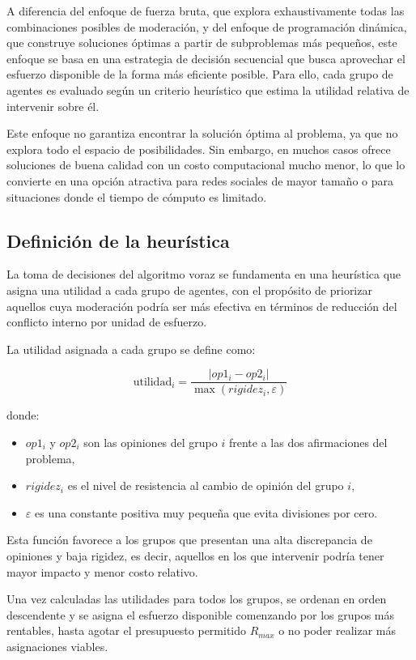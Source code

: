 \documentclass[11pt,letter]{article}
\begin{document}
    A diferencia del enfoque de fuerza bruta, que explora exhaustivamente todas las combinaciones posibles de moderación, y del enfoque de programación dinámica, que construye soluciones óptimas a partir de subproblemas más pequeños, este enfoque se basa en una estrategia de decisión secuencial que busca aprovechar el esfuerzo disponible de la forma más eficiente posible. Para ello, cada grupo de agentes es evaluado según un criterio heurístico que estima la utilidad relativa de intervenir sobre él.

    Este enfoque no garantiza encontrar la solución óptima al problema, ya que no explora todo el espacio de posibilidades. Sin embargo, en muchos casos ofrece soluciones de buena calidad con un costo computacional mucho menor, lo que lo convierte en una opción atractiva para redes sociales de mayor tamaño o para situaciones donde el tiempo de cómputo es limitado.

    \subsection{Definición de la heurística}

    La toma de decisiones del algoritmo voraz se fundamenta en una heurística que asigna una utilidad a cada grupo de agentes, con el propósito de priorizar aquellos cuya moderación podría ser más efectiva en términos de reducción del conflicto interno por unidad de esfuerzo.

    La utilidad asignada a cada grupo se define como:

    \[
        \text{utilidad}_i = \frac{|op1_i - op2_i|}{\max(rigidez_i, \varepsilon)}
    \]

    donde:
    \begin{itemize}
        \item $op1_i$ y $op2_i$ son las opiniones del grupo $i$ frente a las dos afirmaciones del problema,
        \item $rigidez_i$ es el nivel de resistencia al cambio de opinión del grupo $i$,
        \item $\varepsilon$ es una constante positiva muy pequeña que evita divisiones por cero.
    \end{itemize}

    Esta función favorece a los grupos que presentan una alta discrepancia de opiniones y baja rigidez, es decir, aquellos en los que intervenir podría tener mayor impacto y menor costo relativo.

    Una vez calculadas las utilidades para todos los grupos, se ordenan en orden descendente y se asigna el esfuerzo disponible comenzando por los grupos más rentables, hasta agotar el presupuesto permitido $R_{max}$ o no poder realizar más asignaciones viables.
\end{document}

